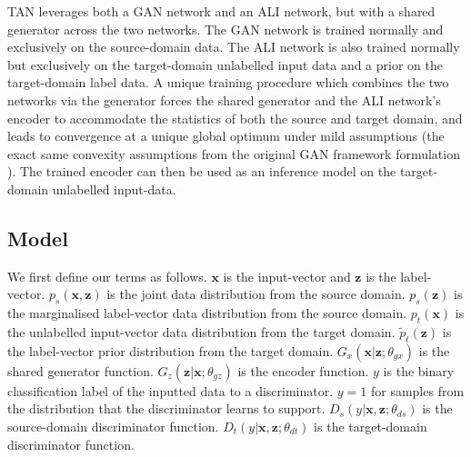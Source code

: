 \documentclass{article}
\begin{document}
TAN leverages both a GAN network and an ALI network, but with a shared generator across the two networks. The GAN network is trained normally and exclusively on the source-domain data. The ALI network is also trained normally but exclusively on the target-domain unlabelled input data and a prior on the target-domain label data. A unique training procedure which combines the two networks via the generator forces the shared generator and the ALI network's encoder to accommodate the statistics of both the source and target domain, and leads to convergence at a unique global optimum under mild assumptions (the exact same convexity assumptions from the original GAN framework formulation \cite{goodfellow2014generative}). The trained encoder can then be used as an inference model on the target-domain unlabelled input-data.
\subsection{Model}
We first define our terms as follows. $\bm{x}$ is the input-vector and $\bm{z}$ is the label-vector. $p_s(\bm{x},\bm{z})$ is the joint data distribution from the source domain. $p_s(\bm{z})$ is the marginalised label-vector data distribution from the source domain. $p_t(\bm{x})$ is the unlabelled input-vector data distribution from the target domain. $\widetilde{p}_t(\bm{z})$ is the label-vector prior distribution from the target domain. $G_x(\bm{x}|\bm{z}; \theta_{gx})$ is the shared generator function. $G_z(\bm{z}|\bm{x}; \theta_{gz})$ is the encoder function. $y$ is the binary classification label of the inputted data to a discriminator. $y=1$ for samples from the distribution that the discriminator learns to support. $D_s(y|\bm{x},\bm{z}; \theta_{ds})$ is the source-domain discriminator function. $D_t(y|\bm{x},\bm{z}; \theta_{dt})$ is the target-domain discriminator function.
\end{document}
